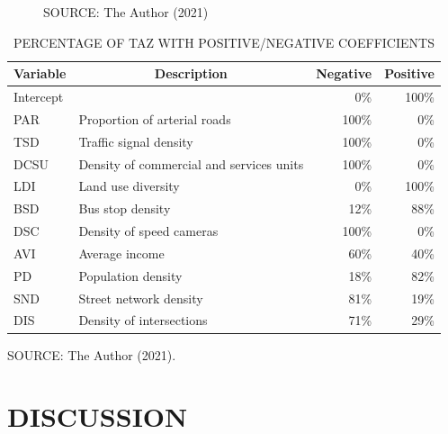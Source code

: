 \begin{figure}[!htbp]
\begin{subfigure}{0.5\textwidth}
    \end{subfigure}    
    \label{fig:gwr_dis}
    \par SOURCE: The Author (2021)
\end{figure}


\begin{table}[!htbp]
    \footnotesize
    \captionsetup{justification=raggedright,
        singlelinecheck=false,
        font=footnotesize}
    \caption{PERCENTAGE OF TAZ WITH POSITIVE/NEGATIVE COEFFICIENTS}
    \centering
    \begin{tabular}{llrr}
        \hline
        \multicolumn{1}{c}{\textbf{Variable}} & \multicolumn{1}{c}{\textbf{Description}} & \multicolumn{1}{c}{\textbf{Negative}} & \multicolumn{1}{c}{\textbf{Positive}} \\
        \hline
        \multicolumn{2}{l}{Intercept}                   &   0\% & 100\% \\
        PAR  & Proportion of arterial roads             & 100\% &   0\% \\
        TSD  & Traffic signal density                   & 100\% &   0\% \\
        DCSU & Density of commercial and services units & 100\% &   0\% \\
        LDI  & Land use diversity                       &   0\% & 100\% \\
        BSD  & Bus stop density                         &  12\% &  88\% \\
        DSC  & Density of speed cameras                 & 100\% &   0\% \\
        AVI  & Average income                           &  60\% &  40\% \\
        PD   & Population density                       &  18\% &  82\% \\
        SND  & Street network density                   &  81\% &  19\% \\
        DIS  & Density of intersections                 &  71\% &  29\% \\
        \hline
    \end{tabular}
    \label{tab:coef_perc}
    \par \vspace{2mm} \footnotesize \raggedright
    SOURCE: The Author (2021).
\end{table}

\chapter{DISCUSSION} \label{chap:discussion}

